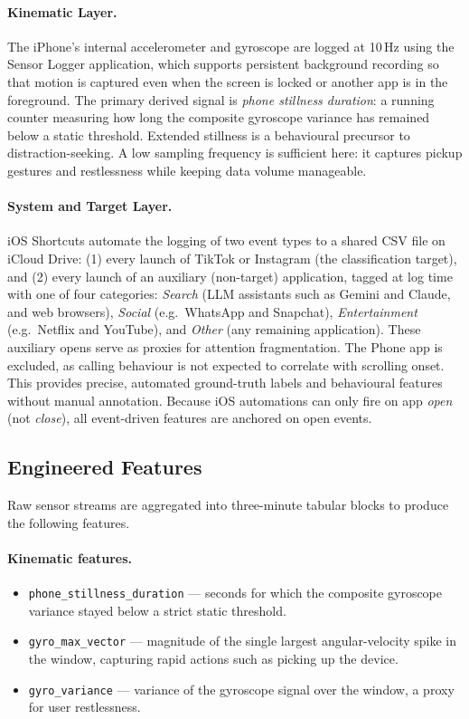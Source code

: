 \documentclass[runningheads]{llncs}
\begin{document}
\paragraph{Kinematic Layer.}
The iPhone's internal accelerometer and gyroscope are logged at 10\,Hz using the Sensor
Logger application, which supports persistent background recording so that motion is
captured even when the screen is locked or another app is in the foreground. The primary
derived signal is \emph{phone stillness duration}: a running counter measuring how long the
composite gyroscope variance has remained below a static threshold. Extended stillness is a
behavioural precursor to distraction-seeking. A low sampling frequency is sufficient here:
it captures pickup gestures and restlessness while keeping data volume manageable.

\paragraph{System and Target Layer.}
iOS Shortcuts automate the logging of two event types to a shared CSV file on iCloud Drive:
(1) every launch of TikTok or Instagram (the classification target), and (2) every launch of
an auxiliary (non-target) application, tagged at log time with one of four categories:
\emph{Search} (LLM assistants such as Gemini and Claude, and web browsers),
\emph{Social} (e.g.\ WhatsApp and Snapchat),
\emph{Entertainment} (e.g.\ Netflix and YouTube), and
\emph{Other} (any remaining application). These auxiliary opens serve as proxies for
attention fragmentation. The Phone app is excluded, as calling behaviour is not expected to
correlate with scrolling onset. This provides precise, automated ground-truth labels and
behavioural features without manual annotation. Because iOS automations can only fire on app
\emph{open} (not \emph{close}), all event-driven features are anchored on open events.

\subsection{Engineered Features}

Raw sensor streams are aggregated into three-minute tabular blocks to produce the following
features.

\paragraph{Kinematic features.}
\begin{itemize}
    \item \texttt{phone\_stillness\_duration} --- seconds for which the composite gyroscope
          variance stayed below a strict static threshold.
    \item \texttt{gyro\_max\_vector} --- magnitude of the single largest angular-velocity
          spike in the window, capturing rapid actions such as picking up the device.
    \item \texttt{gyro\_variance} --- variance of the gyroscope signal over the window, a
          proxy for user restlessness.
\end{itemize}
\end{document}
